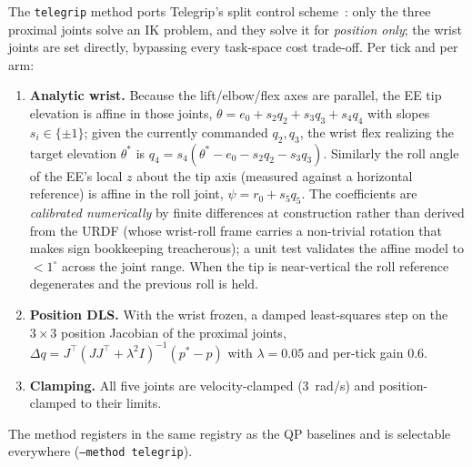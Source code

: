 The \texttt{telegrip} method ports Telegrip's split control
scheme~\citep{telegrip}: only the three proximal joints solve an IK problem,
and they solve it for \emph{position only}; the wrist joints are set
directly, bypassing every task-space cost trade-off. Per tick and per arm:
\begin{enumerate}
  \item \textbf{Analytic wrist.} Because the lift/elbow/flex axes are
  parallel, the EE tip elevation is affine in those joints,
  \(\theta = e_0 + s_2 q_2 + s_3 q_3 + s_4 q_4\) with slopes
  \(s_i\in\{\pm1\}\); given the currently commanded \(q_2,q_3\), the wrist
  flex realizing the target elevation \(\theta^\ast\) is
  \(q_4 = s_4(\theta^\ast - e_0 - s_2 q_2 - s_3 q_3)\). Similarly the roll
  angle of the EE's local \(z\) about the tip axis (measured against a
  horizontal reference) is affine in the roll joint,
  \(\psi = r_0 + s_5 q_5\). The coefficients are \emph{calibrated
  numerically} by finite differences at construction rather than derived
  from the URDF (whose wrist-roll frame carries a non-trivial rotation that
  makes sign bookkeeping treacherous); a unit test validates the affine
  model to \(<1^\circ\) across the joint range. When the tip is
  near-vertical the roll reference degenerates and the previous roll is
  held.
  \item \textbf{Position DLS.} With the wrist frozen, a damped
  least-squares step on the \(3\times3\) position Jacobian of the proximal
  joints, \(\Delta q = J^\top (J J^\top + \lambda^2 I)^{-1}(p^\ast - p)\)
  with \(\lambda=0.05\) and per-tick gain \(0.6\).
  \item \textbf{Clamping.} All five joints are velocity-clamped
  (\SI{3}{rad/s}) and position-clamped to their limits.
\end{enumerate}
The method registers in the same registry as the QP baselines and is
selectable everywhere (\texttt{--method telegrip}).
